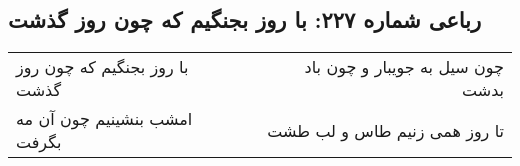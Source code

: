 \begin{center}
\section*{رباعی شماره ۲۲۷: با روز بجنگیم که چون روز گذشت}
\label{sec:0227}
\begin{longtable}{l p{0.5cm} r}
با روز بجنگیم که چون روز گذشت
&&
چون سیل به جویبار و چون باد بدشت
\\
امشب بنشینیم چون آن مه بگرفت
&&
تا روز همی زنیم طاس و لب طشت
\\
\end{longtable}
\end{center}
